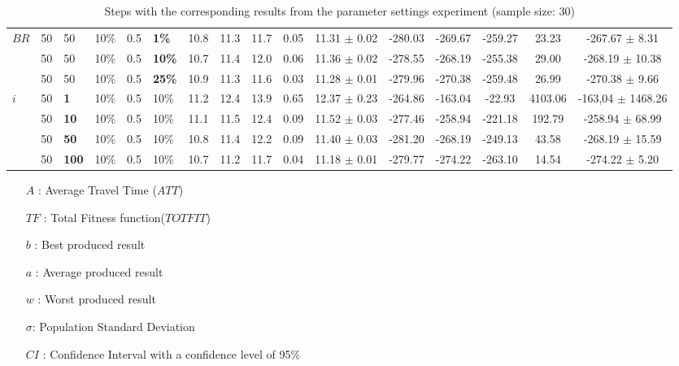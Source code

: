 \begin{sidewaystable}
\begin{tabular}{|l|l|l|l|l|l||c|c|c|c|c|c|c|c|c|c|}
    \hline
    $BR$ & 50 & 50 & 10\% & 0.5 & \textbf{1\%} & 10.8 & 11.3 & 11.7 & 0.05 & 11.31 $\pm$ 0.02 & -280.03 & -269.67 & -259.27 & 23.23 & -267.67 $\pm$ 8.31 \\
    ~    & 50 & 50 & 10\% & 0.5 & \textbf{10\%} & 10.7 & 11.4 & 12.0 & 0.06 & 11.36 $\pm$ 0.02 & -278.55 & -268.19 & -255.38 & 29.00 & -268.19 $\pm$ 10.38 \\
    ~    & 50 & 50 & 10\% & 0.5 & \textbf{25\%} & 10.9 & 11.3 & 11.6 & 0.03 & 11.28 $\pm$ 0.01 & -279.96 & -270.38 & -259.48 & 26.99 & -270.38 $\pm$ 9.66 \\
    \hline
    $i$ & 50 & \textbf{1} & 10\% & 0.5 & 10\% & 11.2 & 12.4 & 13.9 & 0.65 & 12.37 $\pm$ 0.23 & -264.86 & -163.04 & -22.93 & 4103.06 & -163,04 $\pm$ 1468.26 \\
    ~   & 50 &\textbf{10} & 10\% & 0.5 & 10\% & 11.1 & 11.5 & 12.4 & 0.09 & 11.52 $\pm$ 0.03 & -277.46 & -258.94 & -221.18 & 192.79 & -258.94 $\pm$ 68.99 \\
    ~   & 50 &\textbf{50} & 10\% & 0.5 & 10\% & 10.8 & 11.4 & 12.2 & 0.09 & 11.40 $\pm$ 0.03 & -281.20 & -268.19 & -249.13 &  43.58 & -268.19 $\pm$ 15.59 \\
    ~   & 50 &\textbf{100} & 10\% & 0.5 & 10\% & 10.7 & 11.2 & 11.7 & 0.04 & 11.18 $\pm$ 0.01 & -279.77 & -274.22 & -263.10 & 14.54 & -274.22 $\pm$ 5.20 \\
    \hline
    \end{tabular}
    \caption {Steps with the corresponding results from the parameter settings experiment (sample size: 30)}
    \tiny
    \begin{itemize}[noitemsep]
    \item[$A$ :] Average Travel Time ($ATT$)
    \item[$TF$ :] Total Fitness function($TOTFIT$)
    \item[$b$ :] Best produced result
    \item[$a$ :] Average produced result
    \item[$w$ :] Worst produced result
    \item[$\sigma$:] Population Standard Deviation 
    \item[$CI$ :] Confidence Interval with a confidence level of 95\%

\end{itemize}
\end{sidewaystable}
